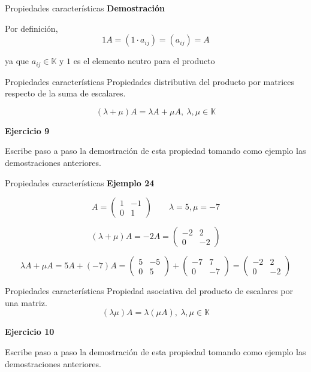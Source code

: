 \documentclass[
  ignorenonframetext,
]{beamer}
\begin{document}
\begin{frame}{Propiedades características}
\protect\hypertarget{propiedades-caracteruxedsticas-19}{}
\textbf{Demostración}

Por definición, \[1A = (1\cdot a_{ij}) = (a_{ij}) = A\]

ya que \(a_{ij}\in\mathbb{K}\) y \(1\) es el elemento neutro para el
producto
\end{frame}

\begin{frame}{Propiedades características}
\protect\hypertarget{propiedades-caracteruxedsticas-20}{}
Propiedades distributiva del producto por matrices respecto de la suma
de escalares.

\[(\lambda +\mu)A = \lambda A+\mu A,\ \lambda,\mu\in\mathbb{K}\]

\textbf{Ejercicio 9}

Escribe paso a paso la demostración de esta propiedad tomando como
ejemplo las demostraciones anteriores.
\end{frame}

\begin{frame}{Propiedades características}
\protect\hypertarget{propiedades-caracteruxedsticas-21}{}
\textbf{Ejemplo 24}

\[A =\begin{pmatrix}1&-1\\0&1\end{pmatrix}\qquad \lambda=5,\mu=-7\]

\[(\lambda +\mu)A=-2A = \begin{pmatrix}-2&2\\0&-2\end{pmatrix}\]

\[\lambda A+\mu A=5A+(-7)A=\begin{pmatrix}5&-5\\0&5\end{pmatrix}+\begin{pmatrix}-7&7\\0&-7\end{pmatrix}=\begin{pmatrix}-2&2\\0&-2\end{pmatrix}\]
\end{frame}

\begin{frame}{Propiedades características}
\protect\hypertarget{propiedades-caracteruxedsticas-22}{}
Propiedad asociativa del producto de escalares por una matriz.
\[(\lambda\mu)A = \lambda(\mu A), \ \lambda,\mu\in\mathbb{K}\]

\textbf{Ejercicio 10}

Escribe paso a paso la demostración de esta propiedad tomando como
ejemplo las demostraciones anteriores.
\end{frame}
\end{document}
